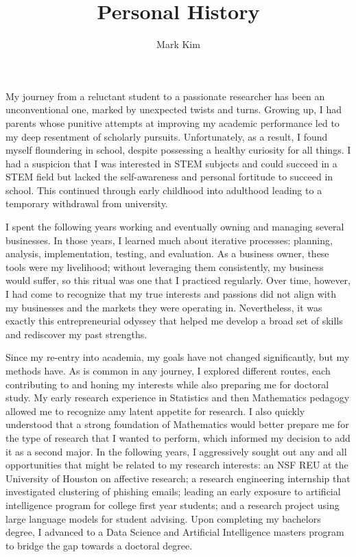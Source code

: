 \documentclass[12pt]{article}
\author{Mark Kim}
\title{Personal History}
\begin{document}
\maketitle
My journey from a reluctant student to a passionate researcher has been an unconventional one, marked by unexpected twists and turns.
Growing up, I had parents whose punitive attempts at improving my academic performance led to my deep resentment of scholarly pursuits.
Unfortunately, as a result, I found myself floundering in school, despite possessing a healthy curiosity for all things. I had a suspicion
that I was interested in STEM subjects and could succeed in a STEM field but lacked the self-awareness and personal fortitude to succeed in
school. This continued through early childhood into adulthood leading to a temporary withdrawal from university.

I spent the following years working and eventually owning and managing several businesses. In those years, I learned much about iterative
processes: planning, analysis, implementation, testing, and evaluation. As a business owner, these tools were my livelihood; without
leveraging them consistently, my business would suffer, so this ritual was one that I practiced regularly. Over time, however, I had come to
recognize that my true interests and passions did not align with my businesses and the markets they were operating in. Nevertheless, it was
exactly this entrepreneurial odyssey that helped me develop a broad set of skills and rediscover my past strengths.

Since my re-entry into academia, my goals have not changed significantly, but my methods have. As is common in any journey, I explored
different routes, each contributing to and honing my interests while also preparing me for doctoral study. My early research experience in
Statistics and then Mathematics pedagogy allowed me to recognize amy latent appetite for research. I also quickly understood that a strong
foundation of Mathematics would better prepare me for the type of research that I wanted to perform, which informed my decision to add it as
a second major. In the following years, I aggressively sought out any and all opportunities that might be related to my research interests:
an NSF REU at the University of Houston on affective research; a research engineering internship that investigated clustering of phishing
emails; leading an early exposure to artificial intelligence program for college first year students; and a research project using large
language models for student advising. Upon completing my bachelors degree, I advanced to a Data Science and Artificial Intelligence masters
program to bridge the gap towards a doctoral degree.
\end{document}
